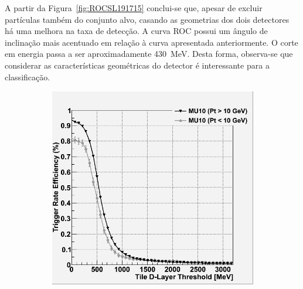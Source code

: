 A partir da Figura~\ref{fig:ROCSL191715} conclui-se que, apesar de excluir
partículas também do conjunto alvo, casando as geometrias dos dois detectores há
uma melhora na taxa de detecção. A curva ROC possui um ângulo de inclinação mais
acentuado em relação à curva apresentada anteriormente. O corte em energia passa
a ser aproximadamente 430~MeV. Desta forma, observa-se que considerar as
características geométricas do detector é interessante para a classificação.

\begin{figure}[htpb!]
        \centering
        \begin{subfigure}[b]{0.45\textwidth}
                \centering
                \includegraphics[width=\textwidth]{images/sglmuon/roc_match_SL.png}
        \end{subfigure}%
        ~
        \begin{subfigure}[b]{0.45\textwidth}
                \centering

\end{subfigure}
\end{figure}

